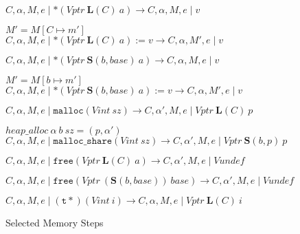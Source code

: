 \documentclass{article}
\begin{document}
\begin{figure}

           {\(C,\alpha,M,e \mid *(\mathit{Vptr} ~ \mathbf{L}(C) ~ a)
             \longrightarrow C,\alpha,M,e \mid v\)}

              {\(M' = M[C \mapsto m']\)}
              {\(C,\alpha,M,e \mid *(\mathit{Vptr} ~ \mathbf{L}(C) ~ a) := v
                \longrightarrow C,\alpha,M',e \mid v\)}

           {\(C,\alpha,M,e \mid *(\mathit{Vptr} ~ \mathbf{S}(b, \mathit{base}) ~ a)
             \longrightarrow C,\alpha,M,e \mid v\)}

              {\(M' = M[b \mapsto m']\)}
              {\(C,\alpha,M,e \mid *(\mathit{Vptr} ~ \mathbf{S}(b, \mathit{base}) ~ a) := v
                \longrightarrow C,\alpha,M',e \mid v\)}

           {\(C,\alpha,M,e\mid \mathtt{malloc}(\mathit{Vint} ~ sz) \longrightarrow
             C,\alpha',M,e \mid \mathit{Vptr} ~ \mathbf{L}(C) ~ p\)}

              {\(\mathit{heap\_alloc} ~ \alpha ~ b ~ sz = (p, \alpha')\)}
              {\(C,\alpha,M,e \mid \mathtt{malloc\_share}(\mathit{Vint} ~ sz) \longrightarrow C,\alpha',M,e \mid \mathit{Vptr} ~ \mathbf{S}(b,p) ~ p\)}

           {\(C,\alpha,M,e \mid \mathtt{free}(\mathit{Vptr} ~ \mathbf{L}(C) ~ a) \longrightarrow
             C,\alpha',M,e \mid \mathit{Vundef}\)}
              
           {\(C,\alpha,M,e \mid \mathtt{free}(\mathit{Vptr} ~ (\mathbf{S}(b, \mathit{base})) ~ \mathit{base}) \longrightarrow
             C,\alpha',M,e \mid \mathit{Vundef}\)}
           
  \judgment[CastIntegerPointer]
           {}
           {\(C,\alpha,M,e \mid \mathtt{(t*)} (\mathit{Vint} ~ i) \longrightarrow
             C,\alpha,M,e \mid \mathit{Vptr} ~ \mathbf{L}(C) ~ \mathit{i}\)}

  \caption{Selected Memory Steps}
  \label{subfig:steps}
\end{figure}
\end{document}
